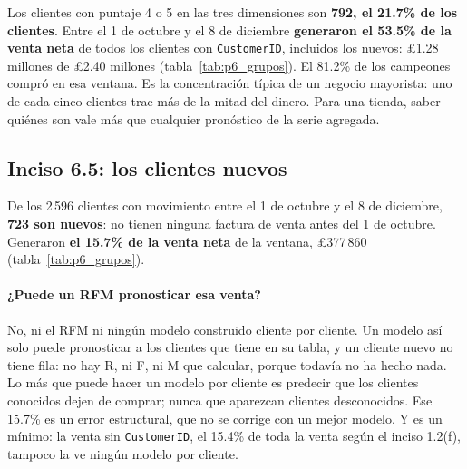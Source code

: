 Los clientes con puntaje 4 o 5 en las tres dimensiones son \textbf{792, el
21.7\% de los clientes}. Entre el 1 de octubre y el 8 de diciembre
\textbf{generaron el 53.5\% de la venta neta} de todos los clientes con
\texttt{CustomerID}, incluidos los nuevos: \pounds1.28 millones de
\pounds2.40 millones (tabla~\ref{tab:p6_grupos}). El 81.2\% de los campeones
compró en esa ventana. Es la concentración típica de un negocio mayorista: uno
de cada cinco clientes trae más de la mitad del dinero. Para una tienda, saber
quiénes son vale más que cualquier pronóstico de la serie agregada.

\begin{table}[H]
  \centering
  \small
  \caption{Reparto de la venta neta del 1 de octubre al 8 de diciembre de 2011
  entre los clientes con \texttt{CustomerID}. ``Clientes con movimiento'' es
  cuántos clientes de cada grupo tuvieron alguna transacción en la ventana.
  Un cliente es nuevo si no tiene ninguna factura de venta antes del 1 de
  octubre.}
  \label{tab:p6_grupos}
\end{table}

\subsection{Inciso 6.5: los clientes nuevos}

De los 2\,596 clientes con movimiento entre el 1 de octubre y el 8 de
diciembre, \textbf{723 son nuevos}: no tienen ninguna factura de venta antes
del 1 de octubre. Generaron \textbf{el 15.7\% de la venta neta} de la ventana,
\pounds377\,860 (tabla~\ref{tab:p6_grupos}).

\paragraph{¿Puede un RFM pronosticar esa venta?} No, ni el RFM ni ningún
modelo construido cliente por cliente. Un modelo así solo puede pronosticar a
los clientes que tiene en su tabla, y un cliente nuevo no tiene fila: no hay R,
ni F, ni M que calcular, porque todavía no ha hecho nada. Lo más que puede
hacer un modelo por cliente es predecir que los clientes conocidos dejen de
comprar; nunca que aparezcan clientes desconocidos. Ese 15.7\% es un error
estructural, que no se corrige con un mejor modelo. Y es un mínimo: la venta
sin \texttt{CustomerID}, el 15.4\% de toda la venta según el inciso 1.2(f),
tampoco la ve ningún modelo por cliente.

